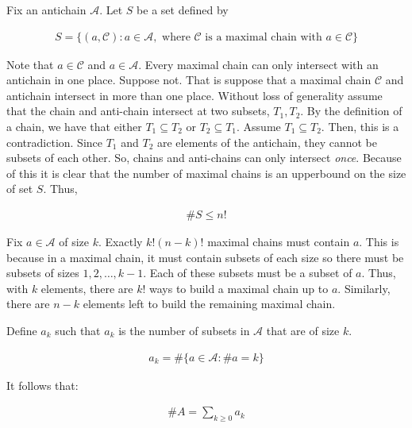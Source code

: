 \documentclass{report}
\begin{document}

\begin{subproof}
    Fix an antichain $\mathcal{A}$. Let $S$ be a set defined by

    \begin{align*}
        S = \{ (a,\mathcal{C}) : a \in \mathcal{A}, \text{ where } \mathcal{C} \text{ is a maximal chain with } a \in \mathcal{C} \}
    \end{align*}

    Note that $a \in \mathcal{C}$ and $a \in \mathcal{A}$. Every maximal chain can only
    intersect with an antichain in one place. Suppose not. That is suppose that
    a maximal chain $\mathcal{C}$ and antichain intersect in more than one place.
    Without loss of generality assume that the chain and anti-chain intersect at
    two subsets, $T_1, T_2$. By the definition of a chain, we have that either
    $T_1 \subseteq T_2$ or $T_2 \subseteq T_1$. Assume $T_1 \subseteq T_2$. Then,
    this is a contradiction. Since $T_1$ and $T_2$ are elements of the antichain,
    they cannot be subsets of each other. So, chains and anti-chains can only intersect
    \textit{once}. Because of this it is clear that the number of maximal chains is
    an upperbound on the size of set $S$. Thus,

    \begin{align*}
        \#S \le n!
    \end{align*}

    Fix $a \in \mathcal{A}$ of size $k$. Exactly $k!(n-k)!$ maximal chains must contain
    $a$. This is because in a maximal chain, it must contain subsets of each size so there
    must be subsets of sizes $1,2, \dots, k-1$. Each of these subsets must be a subset
    of $a$. Thus, with $k$ elements, there are $k!$ ways to build a maximal chain up to
    $a$. Similarly, there are $n-k$ elements left to build the remaining maximal chain.

    Define $a_k$ such that $a_k$ is the number of subsets in $\mathcal{A}$ that are
    of size $k$.

    \begin{align*}
        a_k = \#\{a \in \mathcal{A} : \#a = k\}
    \end{align*}

    It follows that:

    \begin{align*}
        \#A = \sum_{k \ge 0} a_k
    \end{align*}


\end{subproof}
\end{document}
